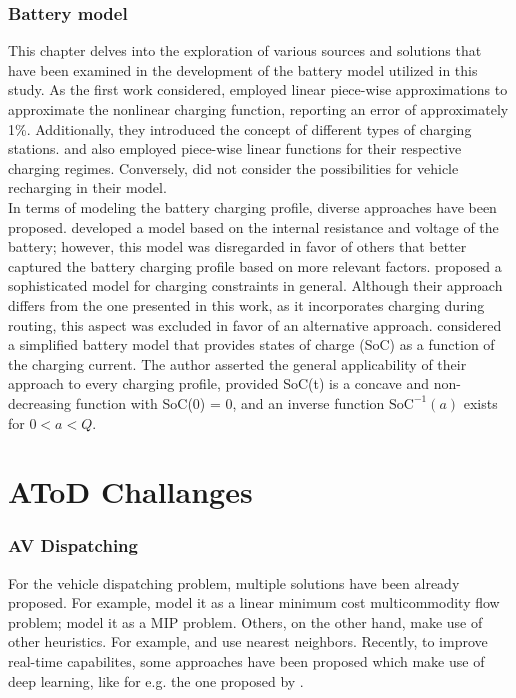 \subsubsection*{Battery model}
This chapter delves into the exploration of various sources and solutions that have been examined in the development of the battery model utilized in this study. As the first work considered,  employed linear piece-wise approximations to approximate the nonlinear charging function, reporting an error of approximately 1\%. Additionally, they introduced the concept of different types of charging stations.  and  also employed piece-wise linear functions for their respective charging regimes. Conversely,  did not consider the possibilities for vehicle recharging in their model.\\
In terms of modeling the battery charging profile, diverse approaches have been proposed.  developed a model based on the internal resistance and voltage of the battery; however, this model was disregarded in favor of others that better captured the battery charging profile based on more relevant factors.  proposed a sophisticated model for charging constraints in general. Although their approach differs from the one presented in this work, as it incorporates charging during routing, this aspect was excluded in favor of an alternative approach.  considered a simplified battery model that provides states of charge (SoC) as a function of the charging current. The author asserted the general applicability of their approach to every charging profile, provided SoC(t) is a concave and non-decreasing function with SoC(0) = 0, and an inverse function $\text{SoC}^{-1}(a)$ exists for $0 < a < Q$.\\
\section{AToD Challanges}

\subsubsection*{AV Dispatching}
For the vehicle dispatching problem, multiple solutions have been already proposed. For example,  model it as a linear minimum cost multicommodity flow problem;  model it as a MIP problem. Others, on the other hand, make use of other heuristics. For example,  and  use nearest neighbors. Recently, to improve real-time capabilites, some approaches have been proposed which make use of deep learning, like for e.g. the one proposed by .\\

